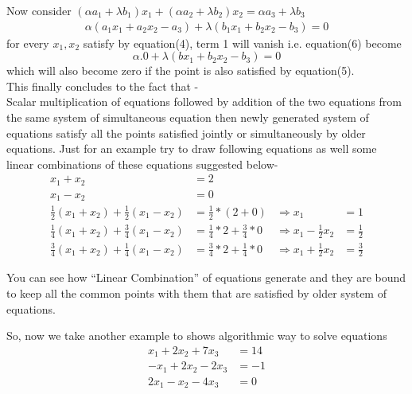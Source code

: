 \documentclass{article}
\begin{document}
Now consider \( (\alpha a_1 + \lambda b_1)x_1 + (\alpha a_2 + \lambda b_2)x_2 = \alpha a_3 + \lambda b_3\)
\begin{align}
    \alpha(a_1x_1 + a_2x_2 - a_3) + \lambda(b_1x_1 + b_2x_2 - b_3) = 0
\end{align}
for every \(x_1, x_2\) satisfy by equation(4), term 1 will vanish i.e. equation(6) become\\
\[
    \alpha.0 + \lambda(bx_1 + b_2x_2 - b_3) = 0
\]
which will also become zero if the point is also satisfied by equation(5).\\
This finally concludes to the fact that - \\
\indent Scalar multiplication of equations followed by addition of the two equations from the same system of simultaneous equation then newly generated system of equations satisfy all the points satisfied jointly or simultaneously by older equations. Just for an example try to draw following equations as well some linear combinations of these equations suggested below-
\begin{align}
    x_1 + x_2 &= 2\nonumber\\
    x_1 - x_2 &= 0\nonumber\\
    \frac{1}{2}(x_1 + x_2) + \frac{1}{2}(x_1 - x_2) &= \frac{1}{2}*(2+0) &\Rightarrow x_1 &= 1\nonumber\\
    \frac{1}{4}(x_1 + x_2) + \frac{3}{4}(x_1 - x_2) &= \frac{1}{4}*2+\frac{3}{4}*0 &\Rightarrow x_1 - \frac{1}{2} x_2&= \frac{1}{2}\nonumber\\
    \frac{3}{4}(x_1 + x_2) + \frac{1}{4}(x_1 - x_2) &= \frac{3}{4}*2+\frac{1}{4}*0 &\Rightarrow x_1 + \frac{1}{2} x_2&= \frac{3}{2}\nonumber
\end{align}

You can see how ``Linear Combination'' of equations generate and they are bound to keep all the common points with them that are satisfied by older system of equations.
















So, now we take another example to shows algorithmic way to solve equations
\begin{align}
    x_1 + 2x_2 + 7x_3 &= 14\label{eq1}\\
    -x_1 + 2x_2 - 2x_3 &= -1\label{eq2}\\
    2x_1 - x_2 - 4x_3 &= 0\label{eq3}
\end{align}
\end{document}
